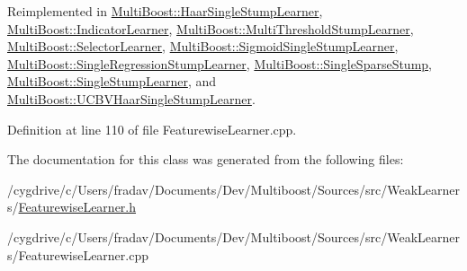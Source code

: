 Reimplemented in \hyperlink{classMultiBoost_1_1HaarSingleStumpLearner_a918541140437c8d7f7575c76b37ad652}{MultiBoost::HaarSingleStumpLearner}, \hyperlink{classMultiBoost_1_1IndicatorLearner_a47fb712bf8e44ebd7a7af759423b8fcc}{MultiBoost::IndicatorLearner}, \hyperlink{classMultiBoost_1_1MultiThresholdStumpLearner_a093c9a16e80ab2fe90470c43f24b0bfb}{MultiBoost::MultiThresholdStumpLearner}, \hyperlink{classMultiBoost_1_1SelectorLearner_aac96f1fddd89c6382240fc7d0ddae478}{MultiBoost::SelectorLearner}, \hyperlink{classMultiBoost_1_1SigmoidSingleStumpLearner_adb4ca5ac6be19aa7244d04ac7b24d79d}{MultiBoost::SigmoidSingleStumpLearner}, \hyperlink{classMultiBoost_1_1SingleRegressionStumpLearner_af449d15e3389ec33d37613e9684148ba}{MultiBoost::SingleRegressionStumpLearner}, \hyperlink{classMultiBoost_1_1SingleSparseStump_a0c815aa6bd664984f0baa6d94cde7cff}{MultiBoost::SingleSparseStump}, \hyperlink{classMultiBoost_1_1SingleStumpLearner_a81fc70ee14b9714289f998977a8e0e1b}{MultiBoost::SingleStumpLearner}, and \hyperlink{classMultiBoost_1_1UCBVHaarSingleStumpLearner_ac57c9a360303b9593a0367256e65fed8}{MultiBoost::UCBVHaarSingleStumpLearner}.



Definition at line 110 of file FeaturewiseLearner.cpp.



The documentation for this class was generated from the following files:\begin{DoxyCompactItemize}
\item 
/cygdrive/c/Users/fradav/Documents/Dev/Multiboost/Sources/src/WeakLearners/\hyperlink{FeaturewiseLearner_8h}{FeaturewiseLearner.h}\item 
/cygdrive/c/Users/fradav/Documents/Dev/Multiboost/Sources/src/WeakLearners/FeaturewiseLearner.cpp\end{DoxyCompactItemize}
